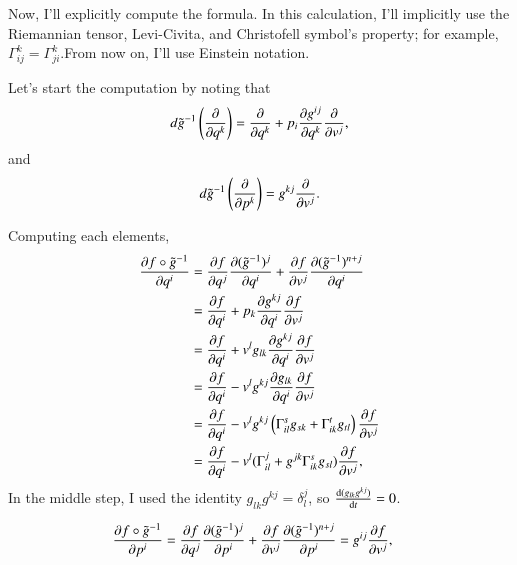 \documentclass[a4paper, 12pt]{article}
\theoremstyle{Mydefinition}
\theoremstyle{Mytheorem}
\begin{document}
Now, I'll explicitly compute the formula. In this calculation, I'll implicitly use the Riemannian tensor, Levi-Civita, and Christofell symbol's property; for example, $\Gamma_{ij}^k=\Gamma_{ji}^k$.From now on, I'll use Einstein notation.

Let's start the computation by noting that
\begin{equation*}
    d\tilde{g}^{-1}\left(\pdv{q^k}\right) = \pdv{q^k} + p_i\pdv{g^{ij}}{q^k}\pdv{v^j},
\end{equation*}
and
\begin{equation*}
    d\tilde{g}^{-1}\left(\pdv{p^k}\right) = g^{kj}\pdv{v^j}.
\end{equation*}

Computing each elements,
\begin{equation*}
    \begin{split}
         \pdv{f\circ \tilde{g}^{-1}}{q^i}&= \pdv{f}{q^j}\pdv{(\tilde{g}^{-1})^j}{q^i} + \pdv{f}{v^j}\pdv{(\tilde{g}^{-1})^{n+j}}{q^i}\\
         &=\pdv{f}{q^i} + p_k\pdv{g^{kj}}{q^i}\pdv{f}{v^j}\\
         &=\pdv{f}{q^i} + v^lg_{lk}\pdv{g^{kj}}{q^i}\pdv{f}{v^j}\\
         &=\pdv{f}{q^i} - v^lg^{kj}\pdv{g_{lk}}{q^i}\pdv{f}{v^j}\\
         &=\pdv{f}{q^i} - v^lg^{kj}\left(\Gamma_{il}^s g_{sk} + \Gamma_{ik}^tg_{tl}\right)\pdv{f}{v^j}\\
         &=\pdv{f}{q^i} - v^l(\Gamma_{il}^j + g^{jk}\Gamma_{ik}^sg_{sl})\pdv{f}{v^j},
    \end{split}
\end{equation*}
In the middle step, I used the identity $g_{lk}g^{kj} = \delta^j_l$, so $\dv{(g_{lk}g^{kj})}{t} = 0$.

\begin{equation*}
    \begin{split}
         \pdv{f\circ \tilde{g}^{-1}}{p^i}&= \pdv{f}{q^j}\pdv{(\tilde{g}^{-1})^j}{p^i} + \pdv{f}{v^j}\pdv{(\tilde{g}^{-1})^{n+j}}{p^i} = g^{ij}\pdv{f}{v^j},
    \end{split}
\end{equation*}
\end{document}
